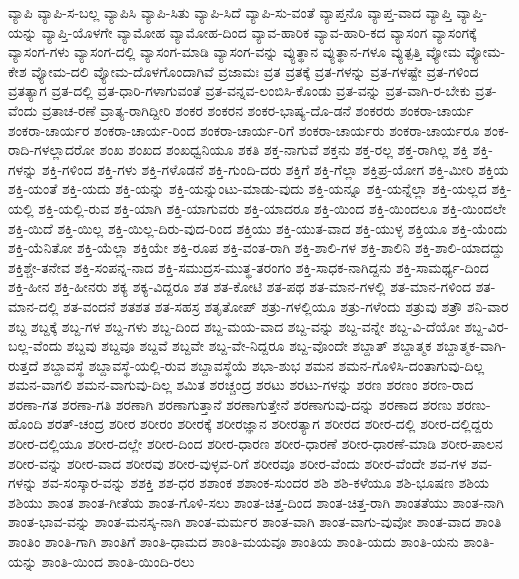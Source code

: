 {ವ್ಯಾಪಿ
ವ್ಯಾಪಿ-ಸ-ಬಲ್ಲ
ವ್ಯಾಪಿಸಿ
ವ್ಯಾಪಿ-ಸಿತು
ವ್ಯಾಪಿ-ಸಿದೆ
ವ್ಯಾಪಿ-ಸು-ವಂತೆ
ವ್ಯಾಪ್ತನೊ
ವ್ಯಾಪ್ತ-ವಾದ
ವ್ಯಾಪ್ತಿ
ವ್ಯಾಪ್ತಿ-ಯನ್ನು
ವ್ಯಾಪ್ತಿ-ಯೊಳಗೇ
ವ್ಯಾಮೋಹ
ವ್ಯಾಮೋಹ-ದಿಂದ
ವ್ಯಾವ-ಹಾರಿಕ
ವ್ಯಾವ-ಹಾರಿ-ಕದ
ವ್ಯಾಸಂಗ
ವ್ಯಾಸಂಗಕ್ಕೆ
ವ್ಯಾಸಂಗ-ಗಳು
ವ್ಯಾಸಂಗ-ದಲ್ಲಿ
ವ್ಯಾಸಂಗ-ಮಾಡಿ
ವ್ಯಾಸಂಗ-ವನ್ನು
ವ್ಯುತ್ಥಾನ
ವ್ಯುತ್ಥಾನ-ಗಳೂ
ವ್ಯುತ್ಪತ್ತಿ
ವ್ಯೋಮ
ವ್ಯೋಮ-ಕೇಶ
ವ್ಯೋಮ-ದಲಿ
ವ್ಯೋಮ-ದೊಳಗೊಂದಾಗಿವೆ
ವ್ರಜಾಮಃ
ವ್ರತ
ವ್ರತಕ್ಕೆ
ವ್ರತ-ಗಳನ್ನು
ವ್ರತ-ಗಳಷ್ಟೇ
ವ್ರತ-ಗಳಿಂದ
ವ್ರತತ್ಯಾಗ
ವ್ರತ-ದಲ್ಲಿ
ವ್ರತ-ಧಾರಿ-ಗಳಾಗುವಂತೆ
ವ್ರತ-ವನ್ನವ-ಲಂಬಿಸಿ-ಕೊಂಡು
ವ್ರತ-ವನ್ನು
ವ್ರತ-ವಾಗಿ-ರ-ಬೇಕು
ವ್ರತ-ವೆಂದು
ವ್ರತಾಚ-ರಣೆ
ವ್ರಾತ್ಯ-ರಾಗಿದ್ದೀರಿ
ಶಂಕರ
ಶಂಕರನ
ಶಂಕರ-ಭಾಷ್ಯ-ದೊ-ಡನೆ
ಶಂಕರರು
ಶಂಕರಾ-ಚಾರ್ಯ
ಶಂಕರಾ-ಚಾರ್ಯರ
ಶಂಕರಾ-ಚಾರ್ಯ-ರಿಂದ
ಶಂಕರಾ-ಚಾರ್ಯ-ರಿಗೆ
ಶಂಕರಾ-ಚಾರ್ಯರು
ಶಂಕರಾ-ಚಾರ್ಯರೂ
ಶಂಕ-ರಾದಿ-ಗಳಲ್ಲಾದರೋ
ಶಂಖ
ಶಂಖದ
ಶಂಖಧ್ವನಿಯೂ
ಶಕತಿ
ಶಕ್ತ-ನಾಗುವೆ
ಶಕ್ತನು
ಶಕ್ತ-ರಲ್ಲ
ಶಕ್ತ-ರಾಗಿಲ್ಲ
ಶಕ್ತಿ
ಶಕ್ತಿ-ಗಳನ್ನು
ಶಕ್ತಿ-ಗಳಿಂದ
ಶಕ್ತಿ-ಗಳು
ಶಕ್ತಿ-ಗಳೊಡನೆ
ಶಕ್ತಿ-ಗುಂದಿ-ದರು
ಶಕ್ತಿಗೆ
ಶಕ್ತಿ-ಗೆಲ್ಲಾ
ಶಕ್ತಿಪ್ರ-ಯೋಗ
ಶಕ್ತಿ-ಮೀರಿ
ಶಕ್ತಿಯ
ಶಕ್ತಿ-ಯಂತೆ
ಶಕ್ತಿ-ಯದು
ಶಕ್ತಿ-ಯನ್ನು
ಶಕ್ತಿ-ಯನ್ನುಂಟು-ಮಾಡು-ವುದು
ಶಕ್ತಿ-ಯನ್ನೂ
ಶಕ್ತಿ-ಯನ್ನೆಲ್ಲಾ
ಶಕ್ತಿ-ಯಲ್ಲದ
ಶಕ್ತಿ-ಯಲ್ಲಿ
ಶಕ್ತಿ-ಯಲ್ಲಿ-ರುವ
ಶಕ್ತಿ-ಯಾಗಿ
ಶಕ್ತಿ-ಯಾಗುವರು
ಶಕ್ತಿ-ಯಾದರೂ
ಶಕ್ತಿ-ಯಿಂದ
ಶಕ್ತಿ-ಯಿಂದಲೂ
ಶಕ್ತಿ-ಯಿಂದಲೇ
ಶಕ್ತಿ-ಯಿದೆ
ಶಕ್ತಿ-ಯಿಲ್ಲ
ಶಕ್ತಿ-ಯಿಲ್ಲ-ದಿರು-ವುದ-ರಿಂದ
ಶಕ್ತಿಯು
ಶಕ್ತಿ-ಯುತ-ವಾದ
ಶಕ್ತಿ-ಯುಳ್ಳ
ಶಕ್ತಿಯೂ
ಶಕ್ತಿ-ಯೆಂದು
ಶಕ್ತಿ-ಯೆನಿತೋ
ಶಕ್ತಿ-ಯೆಲ್ಲಾ
ಶಕ್ತಿಯೇ
ಶಕ್ತಿ-ರೂಪ
ಶಕ್ತಿ-ವಂತ-ರಾಗಿ
ಶಕ್ತಿ-ಶಾಲಿ-ಗಳ
ಶಕ್ತಿ-ಶಾಲಿನಿ
ಶಕ್ತಿ-ಶಾಲಿ-ಯಾದದ್ದು
ಶಕ್ತಿಶ್ಚೇ-ತನೇವ
ಶಕ್ತಿ-ಸಂಪನ್ನ-ನಾದ
ಶಕ್ತಿ-ಸಮುದ್ರಸ-ಮುತ್ಥ-ತರಂಗಂ
ಶಕ್ತಿ-ಸಾಧಕ-ನಾಗಿದ್ದನು
ಶಕ್ತಿ-ಸಾಮರ್ಥ್ಯ-ದಿಂದ
ಶಕ್ತಿ-ಹೀನ
ಶಕ್ತಿ-ಹೀನರು
ಶಕ್ಯ
ಶಕ್ಯ-ವಿದ್ದರೂ
ಶತ
ಶತ-ಕೋಟಿ
ಶತ-ಪಥ
ಶತ-ಮಾನ-ಗಳಲ್ಲಿ
ಶತ-ಮಾನ-ಗಳಿಂದ
ಶತ-ಮಾನ-ದಲ್ಲಿ
ಶತ-ವಂದನೆ
ಶತಶತ
ಶತ-ಸಹಸ್ರ
ಶತೃತೋಪ್
ಶತ್ರು-ಗಳಲ್ಲಿಯೂ
ಶತ್ರು-ಗಳೆಂದು
ಶತ್ರುವು
ಶತ್ರೌ
ಶನಿ-ವಾರ
ಶಬ್ದ
ಶಬ್ದಕ್ಕೆ
ಶಬ್ದ-ಗಳ
ಶಬ್ದ-ಗಳು
ಶಬ್ದ-ದಿಂದ
ಶಬ್ದ-ಮಯ-ವಾದ
ಶಬ್ದ-ವನ್ನು
ಶಬ್ದ-ವನ್ನೇ
ಶಬ್ದ-ವಿ-ದೆಯೋ
ಶಬ್ದ-ವಿರ-ಬಲ್ಲ-ವೆಂದು
ಶಬ್ದವು
ಶಬ್ದವೂ
ಶಬ್ದವೆ
ಶಬ್ದವೇ
ಶಬ್ದ-ವೇ-ನಿದ್ದರೂ
ಶಬ್ದ-ವೊಂದೇ
ಶಬ್ದಾತ್
ಶಬ್ದಾತ್ಮಕ
ಶಬ್ದಾತ್ಮಕ-ವಾಗಿ-ರುತ್ತದೆ
ಶಬ್ದಾವಸ್ಥೆ
ಶಬ್ದಾವಸ್ಥೆ-ಯಲ್ಲಿ-ರುವ
ಶಬ್ದಾವಸ್ಥೆಯೆ
ಶಭಾ-ಶುಭ
ಶಮನ
ಶಮನ-ಗೊಳಿಸಿ-ದಂತಾಗುವು-ದಿಲ್ಲ
ಶಮನ-ವಾಗಲಿ
ಶಮನ-ವಾಗುವು-ದಿಲ್ಲ
ಶಮಿತ
ಶರಚ್ಚಂದ್ರ
ಶರಟು
ಶರಟು-ಗಳನ್ನು
ಶರಣ
ಶರಣಂ
ಶರಣ-ರಾದ
ಶರಣಾ-ಗತ
ಶರಣಾ-ಗತಿ
ಶರಣಾಗಿ
ಶರಣಾಗುತ್ತಾನೆ
ಶರಣಾಗುತ್ತೇನೆ
ಶರಣಾಗುವು-ದನ್ನು
ಶರಣಾದ
ಶರಣು
ಶರಣು-ಹೊಂದಿ
ಶರತ್-ಚಂದ್ರ
ಶರೀರ
ಶರೀರಂ
ಶರೀರಕ್ಕೆ
ಶರೀರಜ್ಞಾನ
ಶರೀರತ್ಯಾಗ
ಶರೀರದ
ಶರೀರ-ದಲ್ಲಿ
ಶರೀರ-ದಲ್ಲಿದ್ದರು
ಶರೀರ-ದಲ್ಲಿಯೂ
ಶರೀರ-ದಲ್ಲೇ
ಶರೀರ-ದಿಂದ
ಶರೀರ-ಧಾರಣ
ಶರೀರ-ಧಾರಣೆ
ಶರೀರ-ಧಾರಣೆ-ಮಾಡಿ
ಶರೀರ-ಪಾಲನ
ಶರೀರ-ವನ್ನು
ಶರೀರ-ವಾದ
ಶರೀರವು
ಶರೀರ-ವುಳ್ಳವ-ರಿಗೆ
ಶರೀರವೂ
ಶರೀರ-ವೆಂದು
ಶರೀರ-ವೆಂದೇ
ಶವ-ಗಳ
ಶವ-ಗಳನ್ನು
ಶವ-ಸಂಸ್ಕಾರ-ವನ್ನು
ಶಶಕ್ತಿ
ಶಶ-ಧರ
ಶಶಾಂಕ
ಶಶಾಂಕ-ಸುಂದರ
ಶಶಿ
ಶಶಿ-ಕಳೆಯೂ
ಶಶಿ-ಭೂಷಣ
ಶಶಿಯ
ಶಶಿಯು
ಶಾಂತ
ಶಾಂತ-ಗೀತೆಯ
ಶಾಂತ-ಗೊಳಿ-ಸಲು
ಶಾಂತ-ಚಿತ್ತ-ದಿಂದ
ಶಾಂತ-ಚಿತ್ತ-ರಾಗಿ
ಶಾಂತತೆಯು
ಶಾಂತ-ನಾಗಿ
ಶಾಂತ-ಭಾವ-ವನ್ನು
ಶಾಂತ-ಮನಸ್ಕ-ನಾಗಿ
ಶಾಂತ-ಮರ್ಮರ
ಶಾಂತ-ವಾಗಿ
ಶಾಂತ-ವಾಗು-ವುವೋ
ಶಾಂತ-ವಾದ
ಶಾಂತಿ
ಶಾಂತಿಂ
ಶಾಂತಿ-ಗಾಗಿ
ಶಾಂತಿಗೆ
ಶಾಂತಿ-ಧಾಮದ
ಶಾಂತಿ-ಮಯವೂ
ಶಾಂತಿಯ
ಶಾಂತಿ-ಯದು
ಶಾಂತಿ-ಯನು
ಶಾಂತಿ-ಯನ್ನು
ಶಾಂತಿ-ಯಿಂದ
ಶಾಂತಿ-ಯಿಂದಿ-ರಲು
}
